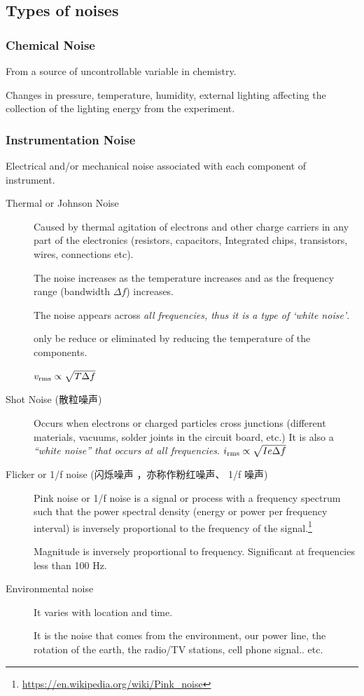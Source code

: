 \documentclass[a4paper,UTF8]{article}
\theoremstyle{mystyle}{
  \newtheorem{law}{Law}
}
\begin{document}
\subsection{Types of noises}
\subsubsection{Chemical Noise}
From a source of uncontrollable variable in chemistry.

Changes in pressure, temperature, humidity, external lighting
affecting the collection of the lighting energy from the experiment.

\subsubsection{Instrumentation Noise}
Electrical and/or mechanical noise associated with each
component of instrument.
\begin{description}
\item[Thermal or Johnson Noise]
Caused by thermal agitation of electrons and other charge
carriers in any part of the electronics (resistors, capacitors,
Integrated chips, transistors, wires, connections etc).

The noise increases as the temperature increases and as the
frequency range (bandwidth $\Delta f$) increases.

The noise appears across \emph{all frequencies, thus it is a type of
‘white noise’}.

only be reduce or eliminated by reducing the
temperature of the components.

$v_{\rm rms}\propto \sqrt{T \Delta f}$
\item[Shot Noise (散粒噪声)]
Occurs when electrons or charged particles cross junctions
(different materials, vacuums, solder joints in the circuit board,
etc.)
It is also a \emph{“white noise” that occurs at all frequencies}.
$i_{\rm rms}\propto \sqrt{I e \Delta f}$
\item[Flicker or 1/f noise (闪烁噪声 ，亦称作粉红噪声、 1/f 噪声)]
Pink noise or 1/f noise is a signal or process with a frequency spectrum such that the power spectral density (energy or power per frequency interval) is inversely proportional to the frequency of the signal.\footnote{\url{https://en.wikipedia.org/wiki/Pink_noise}}

Magnitude is inversely proportional to frequency.
Significant at frequencies less than 100 Hz.

\item[Environmental noise]
It varies with location and time.

It is the noise that comes from the environment, our power line, the
rotation of the earth, the radio/TV stations, cell phone signal.. etc.
\end{description}
\end{document}
